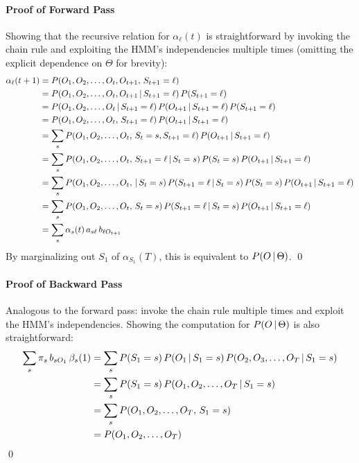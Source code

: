 			\paragraph{Proof of Forward Pass}
				Showing that the recursive relation for \( \alpha_\ell(t) \) is straightforward by invoking the chain rule and exploiting the HMM's independencies multiple times (omitting the explicit dependence on \(\Theta\) for brevity):
				\begin{align}
					\alpha_\ell(t + 1)
						&= P(O_1, O_2, \dots, O_t, O_{t + 1},\, S_{t + 1} = \ell) \\
						&= P(O_1, O_2, \dots, O_t, O_{t + 1} \,\vert\, S_{t + 1} = \ell) \, P(S_{t + 1} = \ell) \\
						&= P(O_1, O_2, \dots, O_t \,\vert\, S_{t + 1} = \ell) \, P(O_{t + 1} \,\vert\, S_{t + 1} = \ell) \, P(S_{t + 1} = \ell) \\
						&= P(O_1, O_2, \dots, O_t,\, S_{t + 1} = \ell) \, P(O_{t + 1} \,\vert\, S_{t + 1} = \ell) \\
						&= \sum_s P(O_1, O_2, \dots, O_t,\, S_t = s, S_{t + 1} = \ell) \, P(O_{t + 1} \,\vert\, S_{t + 1} = \ell) \\
						&= \sum_s P(O_1, O_2, \dots, O_t,\, S_{t + 1} = \ell \,\vert\, S_t = s) \, P(S_t = s) \, P(O_{t + 1} \,\vert\, S_{t + 1} = \ell) \\
						&= \sum_s P(O_1, O_2, \dots, O_t, \,\vert\, S_t = s) \, P(S_{t + 1} = \ell \,\vert\, S_t = s) \, P(S_t = s) \, P(O_{t + 1} \,\vert\, S_{t + 1} = \ell) \\
						&= \sum_s P(O_1, O_2, \dots, O_t,\, S_t = s) \, P(S_{t + 1} = \ell \,\vert\, S_t = s) \, P(O_{t + 1} \,\vert\, S_{t + 1} = \ell) \\
						&= \sum_s \alpha_s(t) \, a_{s \ell} \, b_{\ell O_{t + 1}}
				\end{align}
				By marginalizing out \(S_1\) of \( \alpha_{S_1}(T) \), this is equivalent to \( P(O \,\vert\, \Theta) \).
				\qed

			\paragraph{Proof of Backward Pass}
				Analogous to the forward pass: invoke the chain rule multiple times and exploit the HMM's independencies.
				Showing the computation for \( P(O \,\vert\, \Theta) \) is also straightforward:
				\begin{align}
					\sum_s \pi_s \, b_{s O_1} \, \beta_s(1)
						&= \sum_s P(S_1 = s) \, P(O_1 \,\vert\, S_1 = s ) \, P(O_2, O_3, \dots, O_T \,\vert\, S_1 = s) \\
						&= \sum_s P(S_1 = s) \, P(O_1, O_2, \dots, O_T \,\vert\, S_1 = s) \\
						&= \sum_s P(O_1, O_2, \dots, O_T,\, S_1 = s) \\
						&= P(O_1, O_2, \dots, O_T)
				\end{align}
				\qed

